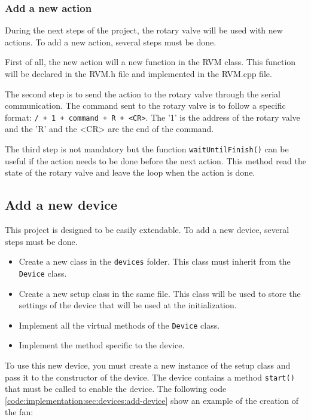 \subsubsection{Add a new action}
\label{ch:implementation:sec:devices:add-action}

During the next steps of the project, the rotary valve will be used with new actions.
To add a new action, several steps must be done.

First of all, the new action will a new function in the RVM class.
This function will be declared in the RVM.h file and implemented in the RVM.cpp file.

The second step is to send the action to the rotary valve through the serial communication.
The command sent to the rotary valve is to follow a specific format: \texttt{/ + 1 + command + R + <CR>}.
The '1' is the address of the rotary valve and the 'R' and the <CR> are the end of the command.

The third step is not mandatory but the function \texttt{waitUntilFinish()} can be useful if the action needs to be done before the next action.
This method read the state of the rotary valve and leave the loop when the action is done.


\subsection{Add a new device}
\label{ch:implementation:sec:devices:add-device}
This project is designed to be easily extendable.
To add a new device, several steps must be done.

\begin{itemize}
  \item Create a new class in the \texttt{devices} folder. This class must inherit from the \texttt{Device} class.
  \item Create a new setup class in the same file. This class will be used to store the settings of the device that will be used at the initialization.
  \item Implement all the virtual methods of the \texttt{Device} class.
  \item Implement the method specific to the device.
\end{itemize}

To use this new device, you must create a new instance of the setup class and pass it to the constructor of the device.
The device contains a method \texttt{start()} that must be called to enable the device.
The following code \ref{code:implementation:sec:devices:add-device} show an example of the creation of the fan:

